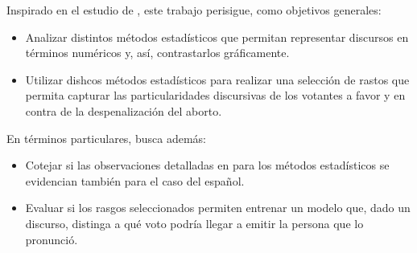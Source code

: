 Inspirado en el estudio de \cite{monroe2008fightin}, este trabajo
perisigue, como objetivos generales:

\begin{itemize}
    \item{Analizar distintos métodos estadísticos que permitan representar
    discursos en términos numéricos y, así, contrastarlos {gr\'aficamente}.}
    \item{Utilizar dishcos métodos estadísticos para realizar una selección de
    rastos que permita capturar las particularidades discursivas de los
    votantes a favor y en contra de la despenalización del aborto.}
\end{itemize}

En términos particulares, busca {adem\'as}:

\begin{itemize}
    \item{Cotejar si las observaciones detalladas en
    \cite{monroe2008fightin} para los métodos estadísticos se evidencian
    también para el caso del español.}
    \item{Evaluar si los rasgos seleccionados permiten entrenar un modelo que,
    dado un discurso, distinga a qué voto podría llegar a emitir la persona que
    lo pronunció.}
\end{itemize}
